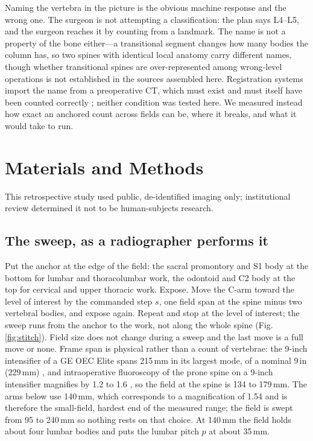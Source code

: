\documentclass[11pt,letterpaper]{article}
\begin{document}
Naming the vertebra in the picture is the obvious machine response and the wrong one. The surgeon is not
attempting a classification: the plan says L4--L5, and the surgeon reaches it by counting from a landmark.
The name is not a property of the bone either---a transitional segment changes how many bodies the column
has, so two spines with identical local anatomy carry different names, though whether transitional spines
are over-represented among wrong-level operations is not established in the sources assembled here.
Registration systems import the name from a preoperative CT, which must exist and must itself have been
counted correctly \citep{levelcheck2012,otake2015}; neither condition was tested here. We measured instead
how exact an anchored count across fields can be, where it breaks, and what it would take to run.

\section*{Materials and Methods}

This retrospective study used public, de-identified imaging only; institutional review determined it not to
be human-subjects research.

\subsection*{The sweep, as a radiographer performs it}
Put the anchor at the edge of the field: the sacral promontory and S1 body at the bottom for lumbar and
thoracolumbar work, the odontoid and C2 body at the top for cervical and upper thoracic work. Expose. Move
the C-arm toward the level of interest by the commanded step $s$, one field span at the spine minus two
vertebral bodies, and expose again. Repeat and stop at the level of interest; the sweep runs from the
anchor to the work, not along the whole spine (Fig.~
\ref{fig:stitch}). Field size does not change during
a sweep and the last move is a full move or none. Frame span is physical rather than a count of vertebrae: the 9-inch intensifier of a
GE OEC Elite spans 215\,mm in its largest mode, of a nominal 9\,in (229\,mm) \citep{ge_k170752}, and intraoperative fluoroscopy of the
prone spine on a 9-inch intensifier magnifies by 1.2 to 1.6 \citep{naik2022}, so the field at the spine
is 134 to 179\,mm. The arms below use 140\,mm, which corresponds to a magnification of 1.54 and is
therefore the small-field, hardest end of the measured range; the field is swept from 95 to 240\,mm so
nothing rests on that choice. At 140\,mm the field holds about four lumbar bodies and puts the lumbar
pitch $p$ at about 35\,mm.
\end{document}
